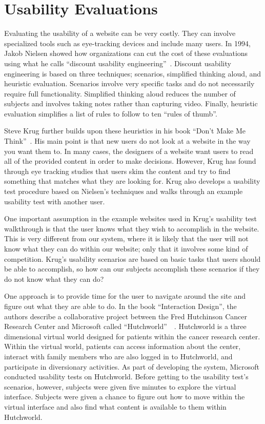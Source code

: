 \section{Usability Evaluations}
\label{related:evaluations}

Evaluating the usability of a website can be very costly.  They can involve specialized tools such as eye-tracking devices and include many users.  In 1994, Jakob Nielsen showed how organizations can cut the cost of these evaluations using what he calls ``discount usability engineering''~\cite{nielsen-guerrilla-hci}.  Discount usability engineering is based on three techniques; scenarios, simplified thinking aloud, and heuristic evaluation.  Scenarios involve very specific tasks and do not necessarily require full functionality.  Simplified thinking aloud reduces the number of subjects and involves taking notes rather than capturing video.  Finally, heuristic evaluation simplifies a list of rules to follow to ten ``rules of thumb''.

Steve Krug further builds upon these heuristics in his book ``Don't Make Me Think''~\cite{krug-dmmt}.  His main point is that new users do not look at a website in the way you want them to.  In many cases, the designers of a website want users to read all of the provided content in order to make decisions.  However, Krug has found through eye tracking studies that users skim the content and try to find something that matches what they are looking for.  Krug also develops a usability test procedure based on Nielsen's techniques and walks through an example usability test with another user.

One important assumption in the example websites used in Krug's usability test walkthrough is that the user knows what they wish to accomplish in the website.  This is very different from our system, where it is likely that the user will not know what they can do within our website; only that it involves some kind of competition.  Krug's usability scenarios are based on basic tasks that users should be able to accomplish, so how can our subjects accomplish these scenarios if they do not know what they can do?

One approach is to provide time for the user to navigate around the site and figure out what they are able to do. In the book ``Interaction Design'', the authors describe a collaborative project between the Fred Hutchinson Cancer Research Center and Microsoft called ``Hutchworld''~\cite{preece-interaction-design}~\cite{cheng-hutchworld}.  Hutchworld is a three dimensional virtual world designed for patients within the cancer research center.  Within the virtual world, patients can access information about the center, interact with family members who are also logged in to Hutchworld, and participate in diversionary activities.  As part of developing the system, Microsoft conducted usability tests on Hutchworld.  Before getting to the usability test's scenarios, however, subjects were given five minutes to explore the virtual interface.  Subjects were given a chance to figure out how to move within the virtual interface and also find what content is available to them within Hutchworld.

